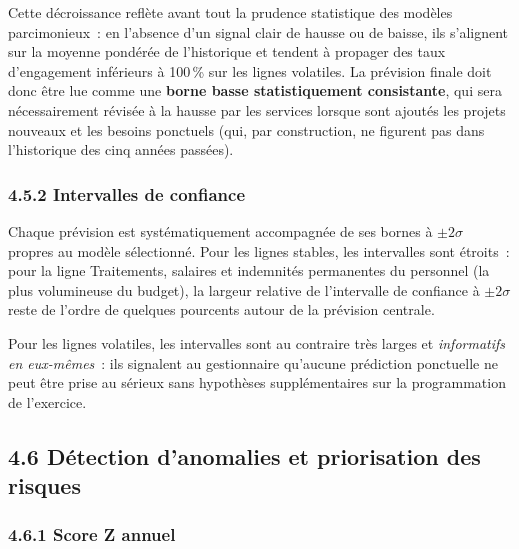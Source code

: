 Cette d\'ecroissance refl\`ete avant tout la
prudence statistique des mod\`eles parcimonieux~: en l'absence d'un signal
clair de hausse ou de baisse, ils s'alignent sur la moyenne pond\'er\'ee de
l'historique et tendent \`a propager des taux d'engagement inf\'erieurs \`a
100\,\% sur les lignes volatiles. La pr\'evision finale doit donc \^etre lue
comme une \textbf{borne basse statistiquement consistante}, qui sera
n\'ecessairement r\'evis\'ee \`a la hausse par les services lorsque sont
ajout\'es les projets nouveaux et les besoins ponctuels (qui, par construction,
ne figurent pas dans l'historique des cinq ann\'ees pass\'ees).

\subsubsection*{4.5.2 \quad Intervalles de confiance}

Chaque pr\'evision est syst\'ematiquement accompagn\'ee de ses bornes \`a
$\pm 2\sigma$ propres au mod\`ele s\'electionn\'e. Pour les lignes stables,
les intervalles sont \'etroits~: pour la ligne \og Traitements, salaires et
indemnit\'es permanentes du personnel \fg{} (la plus volumineuse du budget),
la largeur relative de l'intervalle de confiance \`a $\pm 2\sigma$ reste
de l'ordre de quelques pourcents autour de la pr\'evision centrale.

Pour les lignes volatiles, les intervalles sont au contraire tr\`es larges et
\emph{informatifs en eux-m\^emes}~: ils signalent au gestionnaire qu'aucune
pr\'ediction ponctuelle ne peut \^etre prise au s\'erieux sans hypoth\`eses
suppl\'ementaires sur la programmation de l'exercice.

\subsection*{4.6 \quad D\'etection d'anomalies et priorisation des risques}

\subsubsection*{4.6.1 \quad Score Z annuel}

